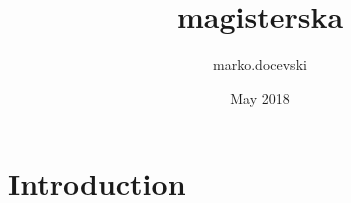 \documentclass{article}
\title{magisterska}
\author{marko.docevski}
\date{May 2018}
\begin{document}
\maketitle

\section{Introduction}
\end{document}
